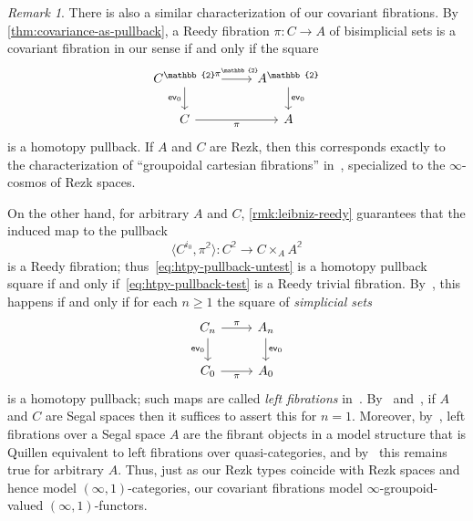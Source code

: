 \documentclass{amsart}
\theoremstyle{plain}
\theoremstyle{definition}
\theoremstyle{remark}
\newtheorem{rmk}[thm]{Remark}
\numberwithin{equation}{section}
\newcommand{\pair}[1]{\langle #1\rangle}
\newcommand{\two}{\mathbb{2}}
\begin{document}
\begin{rmk}\label{rmk:boavida}
  There is also a similar characterization of our covariant fibrations.
 By \cref{thm:covariance-as-pullback}, a Reedy fibration $\pi \colon C \to A$ of bisimplicial sets is a covariant fibration in our sense if and only if the square
  \begin{equation}
  \begin{tikzcd}
    C^\two \arrow[r, "{\pi^\two}"] \arrow[d, "{\mathsf{ev}_0}"'] &
    A^\two \arrow[d, "{\mathsf{ev}_0}"] \\
    C \arrow[r, "\pi"'] &
    A 
  \end{tikzcd}\label{eq:htpy-pullback-untest}
  \end{equation}
  is a homotopy pullback.
  If $A$ and $C$ are Rezk, then this corresponds exactly to the characterization of ``groupoidal cartesian fibrations'' in~\cite[Proposition 4.2.7]{RV4}, specialized to the $\infty$-cosmos of Rezk spaces.

  On the other hand, for arbitrary $A$ and $C$, \cref{rmk:leibniz-reedy} guarantees that the induced map to the pullback
  \begin{equation}\label{eq:htpy-pullback-test} \pair{ C^{i_0}, \pi^\two}  \colon C^\two \to C \times_A A^\two\end{equation}
  is a Reedy fibration; thus~\eqref{eq:htpy-pullback-untest} is a homotopy pullback square if and only if~\eqref{eq:htpy-pullback-test} is a Reedy trivial fibration.
  By~\cite[Lemma 2.1.3]{kv:yoneda-css}, this happens if and only if for each $n\ge 1$ the square of \emph{simplicial sets}
  \[ \begin{tikzcd} C_n \arrow[r, "\pi"] \arrow[d, "{\mathsf{ev}_0}"'] &
    A_n \arrow[d, "{\mathsf{ev}_0}"] \\
    C_0 \arrow[r, "\pi"'] &
    A_0
    \end{tikzcd}\]
  is a homotopy pullback; such maps are called \emph{left fibrations} in~\cite{kv:yoneda-css}.
  By~\cite[Proposition 1.7]{boavida:segr} and~\cite[Lemma 3.9]{rasekh:yoneda-ss}, if $A$ and $C$ are Segal spaces then it suffices to assert this for $n=1$.
  Moreover, by~\cite[Proposition 1.10]{boavida:segr}, left fibrations over a Segal space $A$ are the fibrant objects in a model structure that is Quillen equivalent to left fibrations over quasi-categories, and by~\cite[Theorem 4.8]{rasekh:yoneda-ss} this remains true for arbitrary $A$.
  Thus, just as our Rezk types coincide with Rezk spaces and hence model $(\infty,1)$-categories, our covariant fibrations model $\infty$-groupoid-valued $(\infty,1)$-functors.
\end{rmk}






\end{document}

